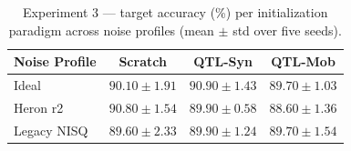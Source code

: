 \documentclass[conference]{IEEEtran}
\begin{document}
\begin{table}[ht]
\caption{Experiment 3 --- target accuracy (\%) per initialization paradigm across noise profiles (mean $\pm$ std over five seeds).}
\label{tab:exp3acc}
\centering
\begin{tabular}{lccc}
\toprule
Noise Profile & Scratch & QTL-Syn & QTL-Mob \\
\midrule
Ideal & $90.10 \pm 1.91$ & $90.90 \pm 1.43$ & $89.70 \pm 1.03$ \\
Heron r2 & $90.80 \pm 1.54$ & $89.90 \pm 0.58$ & $88.60 \pm 1.36$ \\
Legacy NISQ & $89.60 \pm 2.33$ & $89.90 \pm 1.24$ & $89.70 \pm 1.54$ \\
\bottomrule
\end{tabular}
\end{table}

\end{document}

